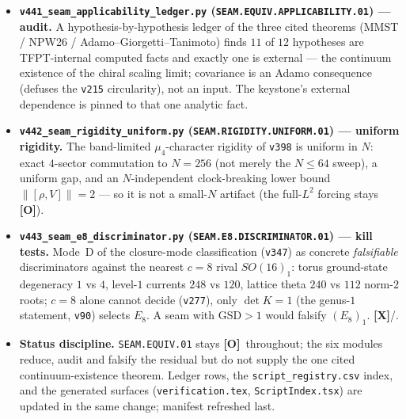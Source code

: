 \documentclass[11pt]{article}
\providecommand{\mO}{\textbf{[O]}}\providecommand{\mX}{\textbf{[X]}}
\begin{document}
\begin{itemize}
$C_\beta{=}1/(1{+}e^{\beta K})$ from the NPW26-proven \emph{trace} state ($\beta{=}0$) to the seam KMS state
($\beta{=}1$) every covariance is reflection-related, $\mu_4$-invariant and valid --- a norm-continuous,
obstruction-free homotopy, upgrading the single point of \texttt{v426} to a path argument for sub-step~(ii) of
\texttt{v424}.
\item \textbf{\texttt{v441\_seam\_applicability\_ledger.py} (\texttt{SEAM.EQUIV.APPLICABILITY.01}) --- audit.}
A hypothesis-by-hypothesis ledger of the three cited theorems (MMST / NPW26 / Adamo--Giorgetti--Tanimoto) finds
$11$ of $12$ hypotheses are TFPT-internal computed facts and exactly one is external --- the continuum existence of
the chiral scaling limit; covariance is an Adamo consequence (defuses the \texttt{v215} circularity), not an input.
The keystone's external dependence is pinned to that one analytic fact.
\item \textbf{\texttt{v442\_seam\_rigidity\_uniform.py} (\texttt{SEAM.RIGIDITY.UNIFORM.01}) --- uniform rigidity.}
The band-limited $\mu_4$-character rigidity of \texttt{v398} is uniform in $N$: exact $4$-sector commutation to
$N{=}256$ (not merely the $N\le64$ sweep), a uniform gap, and an $N$-independent clock-breaking lower bound
$\|[\rho,V]\|{=}2$ --- so it is not a small-$N$ artifact (the full-$L^2$ forcing stays \mO).
\item \textbf{\texttt{v443\_seam\_e8\_discriminator.py} (\texttt{SEAM.E8.DISCRIMINATOR.01}) --- kill tests.}
Mode~D of the closure-mode classification (\texttt{v347}) as concrete \emph{falsifiable} discriminators against the
nearest $c{=}8$ rival $SO(16)_1$: torus ground-state degeneracy $1$ vs $4$, level-$1$ currents $248$ vs $120$,
lattice theta $240$ vs $112$ norm-$2$ roots; $c{=}8$ alone cannot decide (\texttt{v277}), only $\det K{=}1$ (the
genus-$1$ statement, \texttt{v90}) selects $E_8$. A seam with GSD${>}1$ would falsify $(E_8)_1$. \mX/\mC.
\item \textbf{Status discipline.} \texttt{SEAM.EQUIV.01} stays \mO\ throughout; the six modules reduce, audit and
falsify the residual but do not supply the one cited continuum-existence theorem. Ledger rows, the
\texttt{script\_registry.csv} index, and the generated surfaces (\texttt{verification.tex},
\texttt{ScriptIndex.tsx}) are updated in the same change; manifest refreshed last.
\end{itemize}
\end{document}
